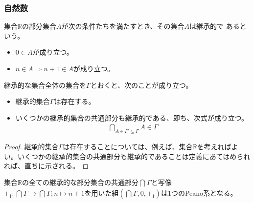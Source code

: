 \documentclass[dvipdfmx]{jsarticle}
\begin{document}
\subsubsection{自然数}%
\begin{dfn}
集合$\mathbb{R}$の部分集合$A$が次の条件たちを満たすとき、その集合$A$は継承的で
あるという。
\begin{itemize}
\item
  $0 \in A$が成り立つ。
\item
  $n \in A \Rightarrow n + 1 \in A$が成り立つ。
\end{itemize}
\end{dfn}
\begin{thm}\label{4.1.1.19}
継承的な集合全体の集合を$\varGamma$とおくと、次のことが成り立つ。
\begin{itemize}
\item
  継承的集合$\varGamma$は存在する。
\item
  いくつかの継承的集合の共通部分も継承的である、即ち、次式が成り立つ。
\begin{align*}
\bigcap_{A \in \varGamma' \subseteq \varGamma} A \in \varGamma
\end{align*}
\end{itemize}
\end{thm}
\begin{proof}
継承的集合$\varGamma$は存在することについては、例えば、集合$\mathbb{R}$を考えればよい。いくつかの継承的集合の共通部分も継承的であることは定義にあてはめられれば、直ちに示される。
\end{proof}
\begin{thm}\label{4.1.1.20}
集合$\mathbb{R}$の全ての継承的な部分集合の共通部分$\bigcap_{} \varGamma$と写像$+_{1}:\bigcap_{} \varGamma \rightarrow \bigcap_{} \varGamma;n \mapsto n + 1$を用いた組$\left( \bigcap_{} \varGamma,0, +_{1} \right)$は1つのPeano系となる。
\end{thm}
\end{document}
